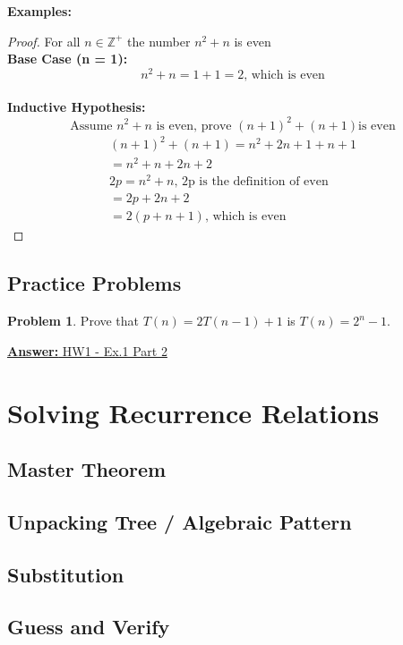\documentclass[12pt]{article}
\theoremstyle{definition}
\newtheorem{practiceproblem}{Problem}[section]
\def\scratchwork{\vspace*{15em}} %
\def\psetone{https://github.com/zacktraczyk/CSE102-Midterm-Study-Guide/blob/main/hw\%20answers/vaggos\_W\_24\_CSE102\_01\_PSET\_1\_solutions.pdf}
\newenvironment{problem}[2]
{
	\def\linktext{#1}
	\def\linkdest{#2}
	\noindent \begin{minipage}{\textwidth}
		\begin{practiceproblem}
}
{	
		\end{practiceproblem}
		\href{\linkdest}{\textbf{Answer:} \linktext}
		\scratchwork
	\end{minipage}
}
\begin{document}
	\noindent \textbf{Examples:}

	\begin{proof} For all $n \in \mathbb{Z}^+$ the number $n^2 + n$ is even \\
		\textbf{Base Case (n = 1):} 
		$$n^2 + n = 1 + 1 = 2\text{, which is even}$$ \\
		\textbf{Inductive Hypothesis:}
		$$\text{Assume }n^2 + n\text{ is even, prove }(n + 1)^2 + (n + 1)\text{
		is even}$$
		\begin{gather}
			(n + 1)^2 + (n + 1) = n^2 + 2n + 1 + n + 1 \\
			= n^2 + n + 2n + 2 \\
			2p = n^2 + n\text{, 2p is the definition of even} \\
			= 2p + 2n + 2 \\
			= 2(p + n + 1)\text{, which is even}
		\end{gather}
	\end{proof}


	\subsection{Practice Problems}

	\begin{problem}{HW1 - Ex.1 Part 2}{\psetone}
		Prove that $T(n) = 2T(n - 1) + 1$ is $T(n) = 2^n - 1$.
	\end{problem}


	\section{Solving Recurrence Relations}

	\subsection{Master Theorem}

	\subsection{Unpacking Tree / Algebraic Pattern}

	\subsection{Substitution}

	\subsection{Guess and Verify}
\end{document}
